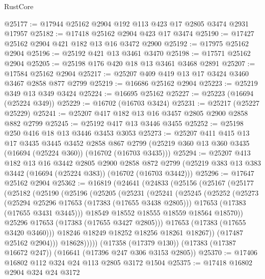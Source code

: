 \begin{lexlean}{RustCore}
\begin{coremodule}
@25177 := @17944 @25162 @2904 @192 @113 @423 @17 @2805 @3474 @2931 @17957
@25182 := @17418 @25162 @2904 @423 @17 @3474
@25190 := @17427 @25162 @2904 @421 @182 @13 @16 @3472 @2900
@25192 := @17975 @25162 @2904
@25196 := @25192 @421 @13 @3461 @3470
@25198 := @17571 @25162 @2904
@25205 := @25198 @176 @420 @18 @13 @3461 @3468 @2891
@25207 := @17584 @25162 @2904
@25217 := @25207 @409 @419 @13 @17 @3424 @3460 @3467 @2858 @877 @2799
@25219 := @16686 @25162 @2904
@25223 := @25219 @349 @13 @349 @3424
@25224 := @16695 @25162
@25227 := @25223 (@16694 (@25224 @349))
@25229 := @16702 (@16703 @3424)
@25231 := @25217 (@25227 @25229)
@25241 := @25207 @417 @182 @13 @16 @3457 @2805 @2900 @2858 @882 @2799
@25245 := @25192 @417 @13 @3446 @3455
@25252 := @25198 @250 @416 @18 @13 @3446 @3453 @3053
@25273 := @25207
    @411
    @415
    @13
    @17
    @3435
    @3445
    @3452
    @2858
    @867
    @2799
    (@25219 @360 @13 @360 @3435 (@16694 (@25224 @360)) (@16702 (@16703 @3435)))
@25294 := @25207
    @413
    @182
    @13
    @16
    @3442
    @2805
    @2900
    @2858
    @872
    @2799
    (@25219 @383 @13 @383 @3442 (@16694 (@25224 @383)) (@16702 (@16703 @3442)))
@25296 := @17647 @25162 @2904
@25362 := @16819
    (@24641
      (@24833
        (@25156
          (@25167
            (@25177
              (@25182
                (@25190
                  (@25196
                    (@25205
                      (@25231
                        (@25241
                          (@25245
                            (@25252
                              (@25273
                                (@25294 @25296 @17653 (@17383 (@17655 @3438 @2805)))
                                @17653
                                (@17383 (@17655 @3431 @3445)))
                              @18549
                              @18552
                              @18555
                              @18559
                              @18564
                              @18570))
                          @25296
                          @17653
                          (@17383 (@17655 @3427 @2805)))
                        @17653
                        (@17383 (@17655 @3420 @3460)))
                      @18246
                      @18249
                      @18252
                      @18256
                      @18261
                      @18267))
                  (@17487 @25162 @2904)))
              @18628)))))
    (@17358 (@17379 @130))
    (@17383 (@17387 @16672 @247))
    (@16641 (@17396 @247 @306 @3153 @2805))
@25370 := @17406 @16802 @112 @324 @24 @113 @2805 @3172 @1504
@25375 := @17418 @16802 @2904 @324 @24 @3172

\end{coremodule}
\end{lexlean}
